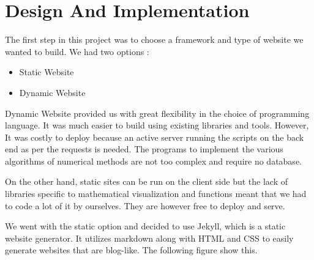 
\chapter{Design And Implementation}

The first step in this project was to choose a framework and type of website we wanted to build. We had two options : 
\begin{itemize}
	\item Static Website
	\item Dynamic Website
\end{itemize}
Dynamic Website provided us with great flexibility in the choice of programming language. It was much easier to build using existing libraries and tools. However, It was costly to deploy because an active server running the scripts on the back end as per the requests is needed. The programs to implement the various algorithms of numerical methods are not too complex and require no database.

On the other hand, static sites can be run on the client side but the lack of libraries specific to mathematical visualization and functions meant that we had to code a lot of it by ourselves. They are however free to deploy and serve.

We went with the static option and decided to use Jekyll, which is a static website generator. It utilizes markdown along with HTML and CSS to easily generate websites that are blog-like. The following figure show this.

